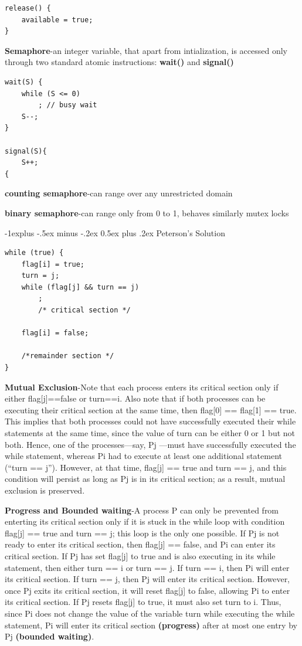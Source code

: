\documentclass[8pt,landscape]{article}
\makeatletter
\renewcommand{\subsection}{\@startsection{subsection}{2}{0mm}%
                                {-1explus -.5ex minus -.2ex}%
                                {0.5ex plus .2ex}%
                                {\normalfont\scriptsize\bfseries}}
\makeatother
\begin{document}
\begin{multicols}{3}
\begin{tiny}
\begin{verbatim}
release() {
    available = true;
}
\end{verbatim}


\textbf{Semaphore}-an integer variable, that apart from intialization, is accessed only through
two standard atomic instructions: \textbf{wait()} and \textbf{signal()}

\begin{verbatim}
wait(S) {
    while (S <= 0)
        ; // busy wait
    S--;
}

signal(S){
    S++;
{
\end{verbatim}

\textbf{counting semaphore}-can range over any unrestricted domain

\textbf{binary semaphore}-can range only from 0 to 1, behaves similarly mutex locks

\subsection{Peterson's Solution}

\begin{verbatim}
while (true) {
    flag[i] = true;
    turn = j;
    while (flag[j] && turn == j)
        ;
        /* critical section */

    flag[i] = false;

    /*remainder section */
}
\end{verbatim}

\textbf{Mutual Exclusion}-Note that each process enters its critical section only if either 
flag[j]==false or turn==i. Also note that if both processes can be executing their critical 
section at the same time, then flag[0] == flag[1] == true. This implies that both processes could
not have successfully executed their while statements at the same time, since the value of turn
can be either 0 or 1 but not both. Hence, one of the processes—say, Pj —must have successfully 
executed the while statement, whereas Pi had to execute at least one additional statement 
(“turn == j”). However, at that time, flag[j] == true and turn == j, and this condition
will persist as long as Pj is in its critical section; as a result, mutual exclusion is
preserved.

\textbf{Progress and Bounded waiting}-A process P can only be prevented from enterting its critical section only if it
is stuck in the while loop with condition flag[j] == true and turn == j; this loop is the only one
possible. If Pj is not ready to enter its critical section, then flag[j] == false, and Pi can 
enter its critical section. If Pj has set flag[j] to true and is also executing in its while
statement, then either turn == i or turn == j. If turn == i, then Pi will enter its critical 
section. If turn == j, then Pj will enter its critical section. However, once Pj exits its 
critical section, it will reset flag[j] to false, allowing Pi to enter its critical section. If
Pj resets flag[j] to true, it must also set turn to i. Thus, since Pi does not change the value
of the variable turn while executing the while statement, Pi will enter its critical section 
\textbf{(progress)} after at most one entry by Pj \textbf{(bounded waiting)}.


\end{tiny}
\end{multicols}
\end{document}
